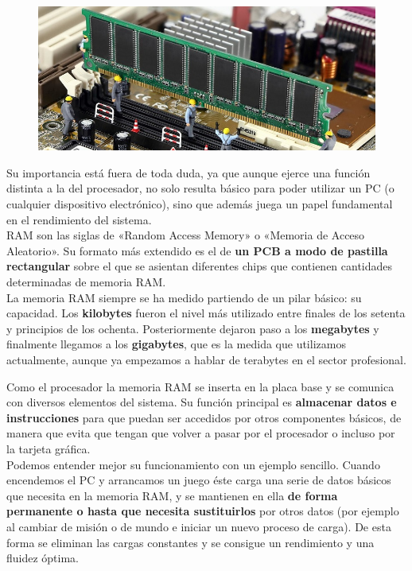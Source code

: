 \documentclass[10pt,letterpaper]{article}
\begin{document}
\begin{justify}
	\begin{figure}[h]
		\centering
		\includegraphics[scale=0.5]{images/ram1.jpg}
	\end{figure}

	\noindent
	Su importancia está fuera de toda duda, ya que aunque ejerce una función distinta a la del procesador, no solo resulta básico para poder utilizar un PC (o cualquier dispositivo electrónico), sino que además juega un papel fundamental en el rendimiento del sistema.\cite{cuarta} \\
	
	\noindent	
	RAM son las siglas de «Random Access Memory» o «Memoria de Acceso Aleatorio». Su formato más extendido es el de \textbf{un PCB a modo de pastilla rectangular} sobre el que se asientan diferentes chips que contienen cantidades determinadas de memoria RAM.\\

	\noindent
	La memoria RAM siempre se ha medido partiendo de un pilar básico: su capacidad. Los \textbf{kilobytes} fueron el nivel más utilizado entre finales de los setenta y principios de los ochenta. Posteriormente dejaron paso a los \textbf{megabytes} y finalmente llegamos a los \textbf{gigabytes}, que es la medida que utilizamos actualmente, aunque ya empezamos a hablar de terabytes en el sector profesional.\\
	\noindent
	
	Como el procesador la memoria RAM se inserta en la placa base y se comunica con diversos elementos del sistema. Su función principal es \textbf{almacenar datos e instrucciones} para que puedan ser accedidos por otros componentes básicos, de manera que evita que tengan que volver a pasar por el procesador o incluso por la tarjeta gráfica.\\
	
	\noindent
	Podemos entender mejor su funcionamiento con un ejemplo sencillo. Cuando encendemos el PC y arrancamos un juego éste carga una serie de datos básicos que necesita en la memoria RAM, y se mantienen en ella \textbf{de forma permanente o hasta que necesita sustituirlos} por otros datos (por ejemplo al cambiar de misión o de mundo e iniciar un nuevo proceso de carga). De esta forma se eliminan las cargas constantes y se consigue un rendimiento y una fluidez óptima.\\
	

\end{justify}
\end{document}
